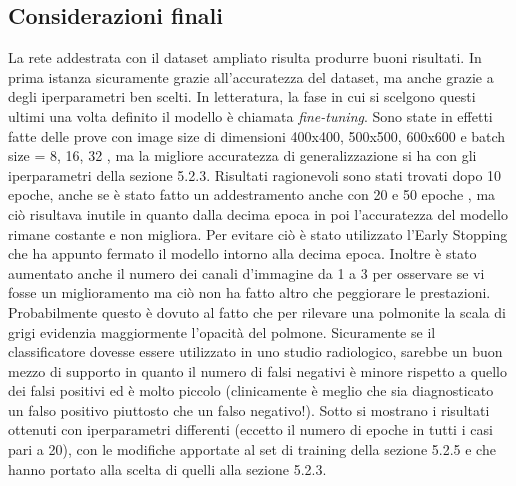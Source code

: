 \subsection{Considerazioni finali}
La rete addestrata con il dataset ampliato risulta produrre buoni risultati. 
In prima istanza sicuramente grazie all’accuratezza del dataset, ma anche grazie a degli iperparametri ben scelti. In letteratura, la fase in cui si scelgono questi ultimi una volta definito il modello è chiamata \emph{fine-tuning}.
Sono state in effetti fatte delle prove con image size di dimensioni 400x400, 500x500, 600x600 e batch size = 8, 16, 32 ,
 ma la migliore accuratezza di generalizzazione si ha con gli iperparametri della sezione 5.2.3. Risultati ragionevoli 
 sono stati trovati dopo 10 epoche, anche se è stato fatto un addestramento anche con 20 e 50 epoche
 , ma ciò risultava inutile in quanto dalla decima epoca in poi l’accuratezza 
 del modello rimane costante e non migliora. Per evitare ciò è stato utilizzato l’Early Stopping che ha
  appunto fermato il modello intorno alla decima epoca. 
Inoltre è stato aumentato anche il numero dei canali d’immagine
 da 1 a 3 per osservare se vi fosse un miglioramento ma ciò non ha fatto altro che peggiorare le prestazioni. Probabilmente 
 questo è dovuto al fatto che per rilevare una polmonite la scala di grigi evidenzia maggiormente l’opacità del polmone. 
Sicuramente se il classificatore dovesse essere utilizzato in uno studio radiologico,
 sarebbe un buon mezzo di supporto in quanto il numero di falsi negativi è minore rispetto
  a quello dei falsi positivi ed è molto piccolo (clinicamente è meglio che sia diagnosticato 
  un falso positivo piuttosto che un falso negativo!). Sotto si mostrano i risultati ottenuti con iperparametri
   differenti (eccetto il numero di epoche in tutti i casi pari a 20), con le modifiche apportate al set di training della sezione 5.2.5
    e che hanno portato alla scelta di quelli alla sezione 5.2.3.

